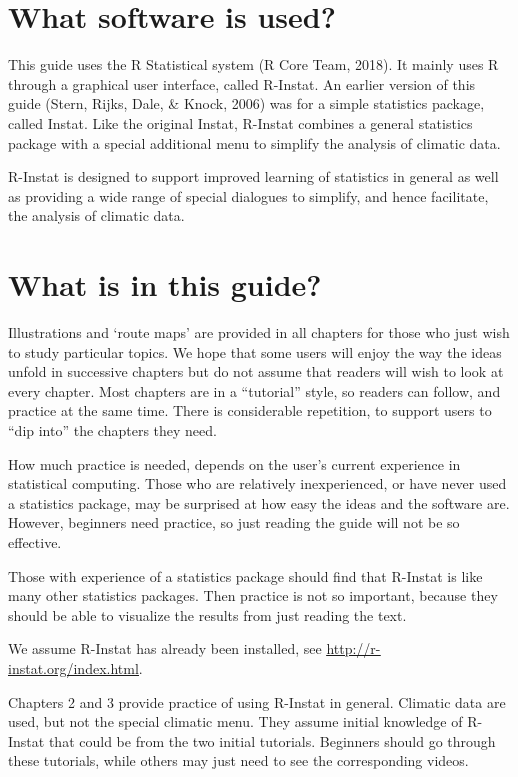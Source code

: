 \documentclass[
  letterpaper,
  DIV=11,
  numbers=noendperiod]{scrreprt}
\begin{document}
\section{What software is used?}\label{what-software-is-used}

This guide uses the R Statistical system (R Core Team, 2018). It mainly
uses R through a graphical user interface, called R-Instat. An earlier
version of this guide (Stern, Rijks, Dale, \& Knock, 2006) was for a
simple statistics package, called Instat. Like the original Instat,
R-Instat combines a general statistics package with a special additional
menu to simplify the analysis of climatic data.

R-Instat is designed to support improved learning of statistics in
general as well as providing a wide range of special dialogues to
simplify, and hence facilitate, the analysis of climatic data.

\section{What is in this guide?}\label{what-is-in-this-guide}

Illustrations and `route maps' are provided in all chapters for those
who just wish to study particular topics. We hope that some users will
enjoy the way the ideas unfold in successive chapters but do not assume
that readers will wish to look at every chapter. Most chapters are in a
``tutorial'' style, so readers can follow, and practice at the same
time. There is considerable repetition, to support users to ``dip into''
the chapters they need.

How much practice is needed, depends on the user's current experience in
statistical computing. Those who are relatively inexperienced, or have
never used a statistics package, may be surprised at how easy the ideas
and the software are. However, beginners need practice, so just reading
the guide will not be so effective.

Those with experience of a statistics package should find that R-Instat
is like many other statistics packages. Then practice is not so
important, because they should be able to visualize the results from
just reading the text.

We assume R-Instat has already been installed, see
\href{http://r-instat.org/index.html}{\ul{http://r-instat.org/index.html}}.

Chapters 2 and 3 provide practice of using R-Instat in general. Climatic
data are used, but not the special climatic menu. They assume initial
knowledge of R-Instat that could be from the two initial tutorials.
Beginners should go through these tutorials, while others may just need
to see the corresponding videos.
\end{document}
